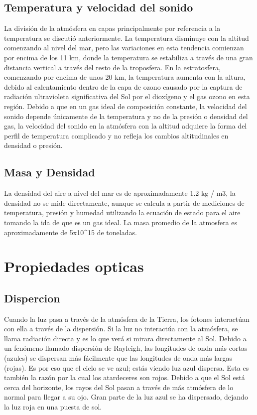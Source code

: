 \documentclass{article}
\begin{document}
\subsection{Temperatura y velocidad del sonido}
La división de la atmósfera en capas principalmente por referencia a la temperatura se discutió anteriormente. La temperatura disminuye con la altitud comenzando al nivel del mar, pero las variaciones en esta tendencia comienzan por encima de los 11 km, donde la temperatura se estabiliza a través de una gran distancia vertical a través del resto de la troposfera. En la estratosfera, comenzando por encima de unos 20 km, la temperatura aumenta con la altura, debido al calentamiento dentro de la capa de ozono causado por la captura de radiación ultravioleta significativa del Sol por el dioxígeno y el gas ozono en esta región. Debido a que en un gas ideal de composición constante, la velocidad del sonido depende únicamente de la temperatura y no de la presión o densidad del gas, la velocidad del sonido en la atmósfera con la altitud adquiere la forma del perfil de temperatura complicado y no refleja los cambios altitudinales en densidad o presión.


\subsection {Masa y Densidad}

La densidad del aire a nivel del mar es de aproximadamente 1.2 kg / m3, la densidad no se mide directamente, aunque se calcula a partir de mediciones de temperatura, presión y humedad utilizando la ecuación de estado para el aire tomando la ida de que es un gas ideal. La masa promedio de la atmosfera es aproximadamente de 5x10\textasciicircum{15} de toneladas.
\section{Propiedades opticas}
\subsection{Dispercion}


Cuando la luz pasa a través de la atmósfera de la Tierra, los fotones interactúan con ella a través de la dispersión. Si la luz no interactúa con la atmósfera, se llama radiación directa y es lo que verá si mirara directamente al Sol. Debido a un fenómeno llamado dispersión de Rayleigh, las longitudes de onda más cortas (azules) se dispersan más fácilmente que las longitudes de onda más largas (rojas). Es por eso que el cielo se ve azul; estás viendo luz azul dispersa.  Esta es también la razón por la cual los atardeceres son rojos. Debido a que el Sol está cerca del horizonte, los rayos del Sol pasan a través de más atmósfera de lo normal para llegar a su ojo. Gran parte de la luz azul se ha dispersado, dejando la luz roja en una puesta de sol.
\end{document}

